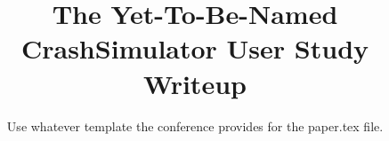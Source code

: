 \documentclass{sig-alternate}
\begin{document}

\title{The Yet-To-Be-Named CrashSimulator User Study Writeup}


\newcommand{\showurlx}{[redacted]}

\author{
Use whatever template the conference provides for the paper.tex file.
}

\maketitle



% 



% 





{\footnotesize 
}
\end{document}
